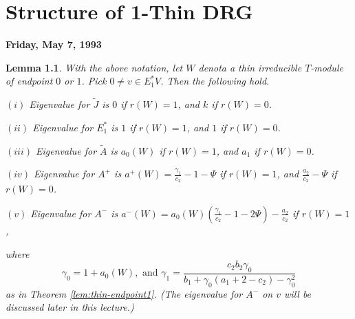 \documentclass[
]{book}
\newtheorem{lemma}{Lemma}[chapter]
\theoremstyle{definition}
\theoremstyle{definition}
\theoremstyle{definition}
\theoremstyle{definition}
\theoremstyle{remark}
\begin{document}
\hypertarget{lec40}{%
\chapter{Structure of 1-Thin DRG}\label{lec40}}

\textbf{Friday, May 7, 1993}

\begin{lemma}
\protect\hypertarget{lem:endpoint-at-most-one}{}\label{lem:endpoint-at-most-one}With the above notation, let \(W\) denota a thin irreducible \(T\)-module of endpoint \(0\) or \(1\). Pick \(0\neq v\in E^*_1V\). Then the following hold.

\((i)\) Eigenvalue for \(\tilde{J}\) is \(0\) if \(r(W)=1\), and \(k\) if \(r(W) = 0\).

\((ii)\) Eigenvalue for \(E^*_1\) is \(1\) if \(r(W)=1\), and \(1\) if \(r(W) = 0\).

\((iii)\) Eigenvalue for \(\tilde{A}\) is \(a_0(W)\) if \(r(W)=1\), and \(a_1\) if \(r(W) = 0\).

\((iv)\) Eigenvalue for \(A^+\) is \(a^+(W) = \frac{\gamma_1}{c_2}-1-\Psi\) if \(r(W)=1\), and \(\frac{a_2}{c_2}-\Psi\) if \(r(W) = 0\).

\((v)\) Eigenvalue for \(A^-\) is \(a^-(W) = a_0(W)\left(\frac{\gamma_1}{c_2}-1-2\Psi\right)-\frac{a_2}{c_2}\) if \(r(W)=1\),

where
\[\gamma_0 = 1+a_0(W), \text{ and } \gamma_1 = \frac{c_2b_2\gamma_0}{b_1+\gamma_0(a_1+2-c_2)-\gamma^2_0}\]
as in Theorem \ref{lem:thin-endpoint1}. (The eigenvalue for \(A^-\) on \(v\) will be discussed later in this lecture.)
\end{lemma}
\end{document}
